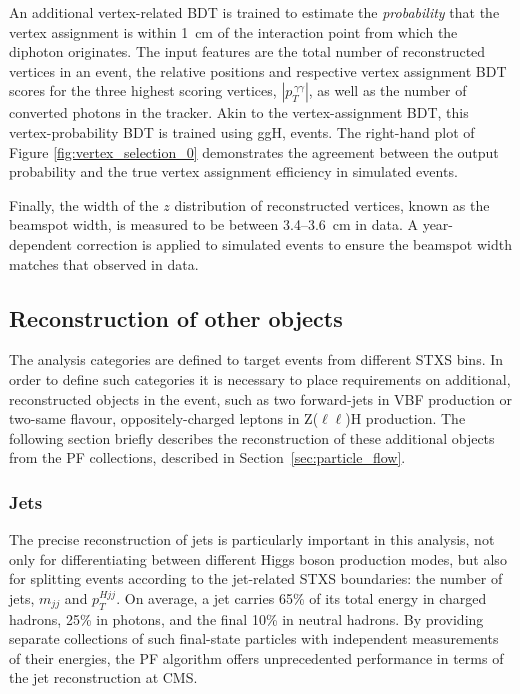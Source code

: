 An additional vertex-related BDT is trained to estimate the \textit{probability} that the vertex assignment is within 1~cm of the interaction point from which the diphoton originates. The input features are the total number of reconstructed vertices in an event, the relative positions and respective vertex assignment BDT scores for the three highest scoring vertices, $|{p}_T^{\,\gamma\gamma}|$, as well as the number of converted photons in the tracker. Akin to the vertex-assignment BDT, this vertex-probability BDT is trained using ggH, \Hgg events. The right-hand plot of Figure \ref{fig:vertex_selection_0} demonstrates the agreement between the output probability and the true vertex assignment efficiency in simulated events.

Finally, the width of the $z$ distribution of reconstructed vertices, known as the beamspot width, is measured to be between 3.4--3.6~cm in data. A year-dependent correction is applied to simulated events to ensure the beamspot width matches that observed in data.

\subsection{Reconstruction of other objects}\label{sec:hgg_otherobjects}
The analysis categories are defined to target events from different STXS bins. In order to define such categories it is necessary to place requirements on additional, reconstructed objects in the event, such as two forward-jets in VBF production or two-same flavour, oppositely-charged leptons in Z($\ell\ell$)H production. The following section briefly describes the reconstruction of these additional objects from the PF collections, described in Section~\ref{sec:particle_flow}.

\subsubsection{Jets}
The precise reconstruction of jets is particularly important in this analysis, not only for differentiating between different Higgs boson production modes, but also for splitting events according to the jet-related STXS boundaries: the number of jets, $m_{jj}$ and $p_T^{Hjj}$. On average, a jet carries 65\% of its total energy in charged hadrons, 25\% in photons, and the final 10\% in neutral hadrons. By providing separate collections of such final-state particles with independent measurements of their energies, the PF algorithm offers unprecedented performance in terms of the jet reconstruction at CMS. 

